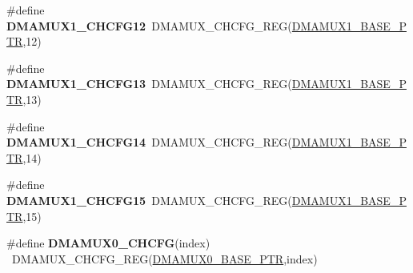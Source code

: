 \begin{DoxyCompactItemize}
\item 
\hypertarget{group___d_m_a_m_u_x___register___accessor___macros_ga2bf99affda727af1e03782091ad9962b}{}\#define {\bfseries D\+M\+A\+M\+U\+X1\+\_\+\+C\+H\+C\+F\+G12}~D\+M\+A\+M\+U\+X\+\_\+\+C\+H\+C\+F\+G\+\_\+\+R\+E\+G(\hyperlink{group___d_m_a_m_u_x___peripheral_gad6b43366c6448bd157f17be565d8e1f3}{D\+M\+A\+M\+U\+X1\+\_\+\+B\+A\+S\+E\+\_\+\+P\+T\+R},12)\label{group___d_m_a_m_u_x___register___accessor___macros_ga2bf99affda727af1e03782091ad9962b}

\item 
\hypertarget{group___d_m_a_m_u_x___register___accessor___macros_ga963a1775f40ac7e6743b6a67171c2c30}{}\#define {\bfseries D\+M\+A\+M\+U\+X1\+\_\+\+C\+H\+C\+F\+G13}~D\+M\+A\+M\+U\+X\+\_\+\+C\+H\+C\+F\+G\+\_\+\+R\+E\+G(\hyperlink{group___d_m_a_m_u_x___peripheral_gad6b43366c6448bd157f17be565d8e1f3}{D\+M\+A\+M\+U\+X1\+\_\+\+B\+A\+S\+E\+\_\+\+P\+T\+R},13)\label{group___d_m_a_m_u_x___register___accessor___macros_ga963a1775f40ac7e6743b6a67171c2c30}

\item 
\hypertarget{group___d_m_a_m_u_x___register___accessor___macros_ga6af243bc99b5a1791d83156c373c6925}{}\#define {\bfseries D\+M\+A\+M\+U\+X1\+\_\+\+C\+H\+C\+F\+G14}~D\+M\+A\+M\+U\+X\+\_\+\+C\+H\+C\+F\+G\+\_\+\+R\+E\+G(\hyperlink{group___d_m_a_m_u_x___peripheral_gad6b43366c6448bd157f17be565d8e1f3}{D\+M\+A\+M\+U\+X1\+\_\+\+B\+A\+S\+E\+\_\+\+P\+T\+R},14)\label{group___d_m_a_m_u_x___register___accessor___macros_ga6af243bc99b5a1791d83156c373c6925}

\item 
\hypertarget{group___d_m_a_m_u_x___register___accessor___macros_ga116dd7683915bdaec023f787c238139d}{}\#define {\bfseries D\+M\+A\+M\+U\+X1\+\_\+\+C\+H\+C\+F\+G15}~D\+M\+A\+M\+U\+X\+\_\+\+C\+H\+C\+F\+G\+\_\+\+R\+E\+G(\hyperlink{group___d_m_a_m_u_x___peripheral_gad6b43366c6448bd157f17be565d8e1f3}{D\+M\+A\+M\+U\+X1\+\_\+\+B\+A\+S\+E\+\_\+\+P\+T\+R},15)\label{group___d_m_a_m_u_x___register___accessor___macros_ga116dd7683915bdaec023f787c238139d}

\item 
\hypertarget{group___d_m_a_m_u_x___register___accessor___macros_ga0e81bfe2cfefc7729dab0f2f979f4afd}{}\#define {\bfseries D\+M\+A\+M\+U\+X0\+\_\+\+C\+H\+C\+F\+G}(index)                                      ~D\+M\+A\+M\+U\+X\+\_\+\+C\+H\+C\+F\+G\+\_\+\+R\+E\+G(\hyperlink{group___d_m_a_m_u_x___peripheral_ga403b61d306820e4e1113c636300004a3}{D\+M\+A\+M\+U\+X0\+\_\+\+B\+A\+S\+E\+\_\+\+P\+T\+R},index)\label{group___d_m_a_m_u_x___register___accessor___macros_ga0e81bfe2cfefc7729dab0f2f979f4afd}


\end{DoxyCompactItemize}
